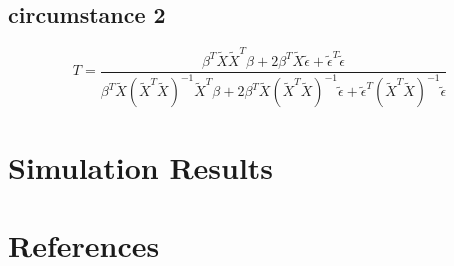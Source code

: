 \documentclass[review]{elsarticle}
\theoremstyle{plain}
\theoremstyle{definition}
\theoremstyle{remark}
\begin{document}
\subsection{circumstance 2}




\begin{equation}
    T=\frac{\beta^T \tilde{X}\tilde{X}^T \beta+
        2\beta^T \tilde{X}\tilde{\epsilon}+
        \tilde{\epsilon}^T\tilde{\epsilon}
    }{\beta^T \tilde{X}{(\tilde{X}^T\tilde{X})}^{-1}\tilde{X}^T \beta+
        2\beta^T \tilde{X}{(\tilde{X}^T\tilde{X})}^{-1}\tilde{\epsilon}+
        \tilde{\epsilon}^T{(\tilde{X}^T\tilde{X})}^{-1}\tilde{\epsilon}
    }
\end{equation}

\section{Simulation Results}


\section*{References}

\end{document}
